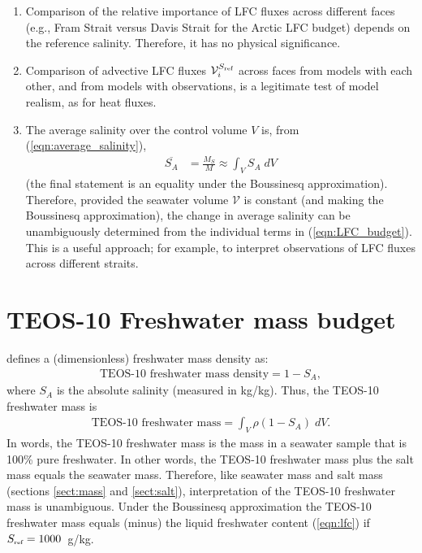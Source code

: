 \documentclass[10pt]{amsart}
\newcommand{\Sref}{S_{\mbox{\tiny ref}}}
\newcommand{\V}{{\mathcal V}}
\newcommand{\LFC}{\V^{\Sref}}
\begin{document}
\begin{enumerate}
\item Comparison of the relative importance of LFC fluxes across different faces (e.g., Fram Strait versus Davis Strait for the Arctic LFC budget) depends on the reference salinity. Therefore, it has no physical significance.
\item Comparison of advective LFC fluxes $\LFC_i$ across faces from models with each other, and from models with observations, is a legitimate test of model realism, as for heat fluxes.
\item The average salinity over the control volume $V$ is, from (\ref{eqn:average_salinity}),
\begin{align}
\overline{S_A} &= \frac{M_S}{M}  \approx \int_V S_A \; dV  \nonumber
\end{align}
(the final statement is an equality under the Boussinesq approximation).
Therefore, provided the seawater volume $\V$ is constant (and making the Boussinesq approximation), the change in average salinity can be unambiguously determined from the individual terms in (\ref{eqn:LFC_budget}).
This is a useful approach; for example, to interpret observations of LFC fluxes across different straits.
\end{enumerate}

\section{TEOS-10 Freshwater mass budget}
\cite{ioc10} defines a (dimensionless) freshwater mass density as:
\begin{align}
\text{TEOS-10~freshwater~mass~density} = 1 - S_A , \nonumber
\end{align}
where $S_A$ is the absolute salinity (measured in kg/kg).
Thus, the TEOS-10 freshwater mass is
\begin{align}
\text{TEOS-10~freshwater~mass} = \int_V \rho \left( 1 - S_A \right) \; dV . \nonumber
\end{align}
In words, the TEOS-10 freshwater mass is the mass in a seawater sample that is 100\% pure freshwater.
In other words, the TEOS-10 freshwater mass plus the salt mass equals the seawater mass.
Therefore, like seawater mass and salt mass (sections \ref{sect:mass} and \ref{sect:salt}), interpretation of the TEOS-10 freshwater mass is unambiguous.
Under the Boussinesq approximation the TEOS-10 freshwater mass equals (minus) the liquid freshwater content (\ref{eqn:lfc}) if $\Sref = 1000$~g/kg.
\end{document}
